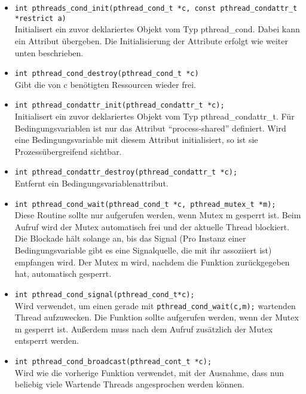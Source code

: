 \documentclass[11pt,a4paper]{article}
\begin{document}
\begin{itemize}

	\item \lstinline$int pthreads_cond_init(pthread_cond_t *c, const pthread_condattr_t *restrict a)$ \\
Initialisert ein zuvor deklariertes Objekt vom Typ pthread\_cond. Dabei kann ein Attribut übergeben. Die Initialisierung der Attribute erfolgt wie weiter unten beschrieben.

	\item \lstinline$int pthread_cond_destroy(pthread_cond_t *c)$ \\
Gibt die von c benötigten Ressourcen wieder frei.

	\item \lstinline$int pthread_condattr_init(pthread_condattr_t *c);$\\
Initialisert ein zuvor deklariertes Objekt vom Typ pthread\_condattr\_t. Für Bedingungsvariablen ist nur das Attribut ``process-shared'' definiert. Wird eine Bedingungsvariable mit diesem Attribut initialisiert, so ist sie Prozessübergreifend sichtbar.

	\item \lstinline$int pthread_condattr_destroy(pthread_condattr_t *c);$\\
Entfernt ein Bedingungsvariablenattribut.

	\item \lstinline$int pthread_cond_wait(pthread_cond_t *c, pthread_mutex_t *m);$ \\
Diese Routine sollte nur aufgerufen werden, wenn Mutex m gesperrt ist. Beim Aufruf wird der Mutex automatisch frei und der aktuelle Thread blockiert. Die Blockade hält solange an, bis das Signal (Pro Instanz einer Bedingungsvariable gibt es eine Signalquelle, die mit ihr assoziiert ist) empfangen wird. Der Mutex m wird, nachdem die Funktion zurückgegeben hat, automatisch gesperrt.

	\item \lstinline$int pthread_cond_signal(pthread_cond_t*c);$ \\
Wird verwendet, um einen gerade mit \lstinline$pthread_cond_wait(c,m);$ wartenden Thread aufzuwecken. Die Funktion sollte aufgerufen werden, wenn der Mutex m gesperrt ist. Außerdem muss nach dem Aufruf zusätzlich der Mutex entsperrt werden.

	\item \lstinline$int pthread_cond_broadcast(pthread_cont_t *c);$\\
Wird wie die vorherige Funktion verwendet, mit der Ausnahme, dass nun beliebig viele Wartende Threads angesprochen werden können.

\end{itemize}
\end{document}
